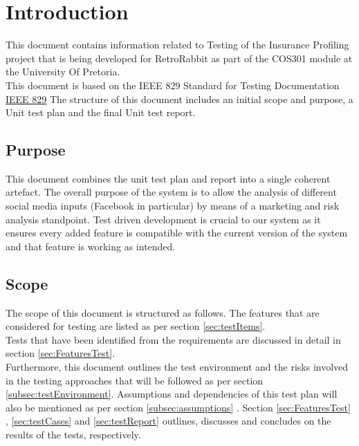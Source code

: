 \documentclass{article}
\begin{document}
	\cleardoublepage
	\tableofcontents
	\cleardoublepage
	
\section{Introduction}
This document contains information related to Testing of the Insurance Profiling project that is being developed for RetroRabbit as part of the COS301 module at the University Of Pretoria. \\
This document is based on the IEEE 829 Standard for Testing Documentation \href{http://www.fit.vutbr.cz/study/courses/ITS/public/ieee829.html}{IEEE 829}
The structure of this document includes an initial scope and purpose, a Unit test plan and the final Unit test report.
\subsection{Purpose}
This document combines the unit test plan and report into a single coherent artefact. The overall purpose of the system is to allow the analysis of different social media inputs (Facebook in particular) by means of a marketing and risk analysis standpoint.
Test driven development is crucial to our system as it ensures every added feature is compatible with the current version of the system and that feature is working as intended.
\subsection{Scope}
The scope of this document is structured as follows. The features that are considered for testing are listed as per section \ref{sec:testItems}. \\
Tests that have been identified from the requirements are
discussed in detail in section \ref{sec:FeaturesTest}.\\
Furthermore, this document outlines the test environment and the risks involved in the testing approaches that will be followed as per section \ref{subsec:testEnvironment}. Assumptions and dependencies of this test plan will also be mentioned as per section \ref{subsec:assumptions} . Section \ref{sec:FeaturesTest} , \ref{sec:testCases} and \ref{sec:testReport} outlines, discusses and concludes on the results of the tests, respectively.
\end{document}
